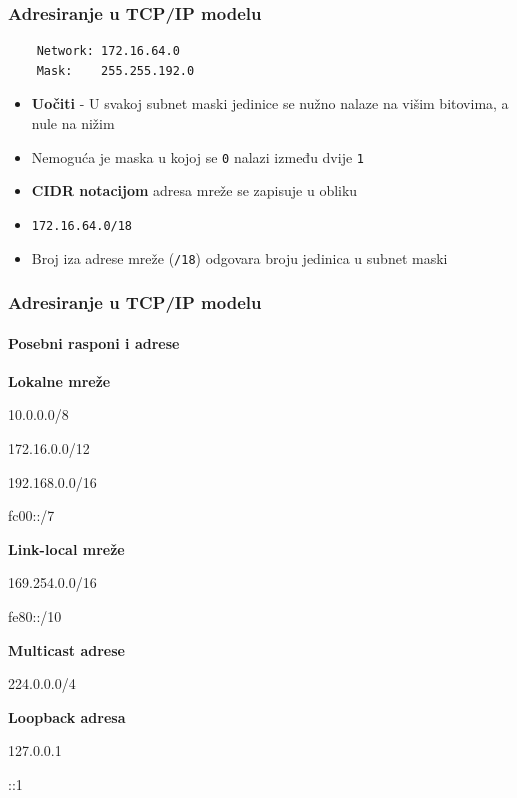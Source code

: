 \documentclass[t,table,usenames,dvipsnames]{beamer}
\begin{document}
\begin{frame}[fragile]
	\frametitle{Adresiranje u TCP/IP modelu}
	\begin{verbatim}
	Network: 172.16.64.0
	Mask:    255.255.192.0
	\end{verbatim}
	\begin{itemize}
		\item \textbf{Uočiti} - U svakoj subnet maski jedinice se nužno nalaze na višim bitovima, a nule na nižim
		\item Nemoguća je maska u kojoj se \texttt{0} nalazi između dvije \texttt{1}
	\end{itemize}
	\begin{itemize}
		\item \textbf{CIDR notacijom} adresa mreže se zapisuje u obliku
		\item[] \texttt{172.16.64.0/18}
		\item Broj iza adrese mreže (\texttt{/18}) odgovara broju jedinica u subnet maski
	\end{itemize}
\end{frame}

\begin{frame}
	\frametitle{Adresiranje u TCP/IP modelu}
	\framesubtitle{Posebni rasponi i adrese}
	\begin{minipage}[t]{0.45\linewidth}
	\textbf{Lokalne mreže}
	\begin{itemize}
		{\ttfamily
			\item[] 10.0.0.0/8
			\item[] 172.16.0.0/12
			\item[] 192.168.0.0/16
			\item[] fc00::/7
		}
	\end{itemize}
	\end{minipage}
	\begin{minipage}[t]{0.45\linewidth}
	\textbf{Link-local mreže}
	\begin{itemize}
		{\ttfamily
			\item[] 169.254.0.0/16
			\item[] fe80::/10
		}
	\end{itemize}
	\end{minipage}
	\vfill 
	\textbf{Multicast adrese}
	\begin{itemize}
		{\ttfamily 
			\item[] 224.0.0.0/4
		}
	\end{itemize}
	\textbf{Loopback adresa}
	\begin{itemize}
		{\ttfamily
			\item[] 127.0.0.1
			\item[] ::1
		}
	\end{itemize}
\end{frame}
\end{document}
